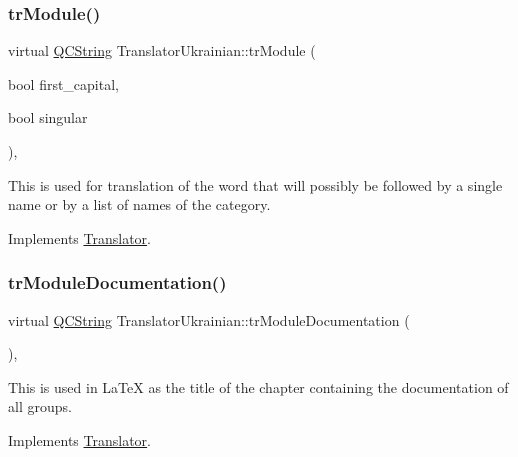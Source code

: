 \mbox{\label{class_translator_ukrainian_a5cc547702356284784fac3be5745b57d}} 
\subsubsection{\texorpdfstring{trModule()}{trModule()}}
{\footnotesize\ttfamily virtual \mbox{\hyperlink{class_q_c_string}{Q\+C\+String}} Translator\+Ukrainian\+::tr\+Module (\begin{DoxyParamCaption}\item[{bool}]{first\+\_\+capital,  }\item[{bool}]{singular }\end{DoxyParamCaption})\hspace{0.3cm}{\ttfamily [inline]}, {\ttfamily [virtual]}}

This is used for translation of the word that will possibly be followed by a single name or by a list of names of the category. 

Implements \mbox{\hyperlink{class_translator}{Translator}}.

\mbox{\label{class_translator_ukrainian_ac277963567d0c0d13d488b24abf76076}} 
\subsubsection{\texorpdfstring{trModuleDocumentation()}{trModuleDocumentation()}}
{\footnotesize\ttfamily virtual \mbox{\hyperlink{class_q_c_string}{Q\+C\+String}} Translator\+Ukrainian\+::tr\+Module\+Documentation (\begin{DoxyParamCaption}{ }\end{DoxyParamCaption})\hspace{0.3cm}{\ttfamily [inline]}, {\ttfamily [virtual]}}

This is used in La\+TeX as the title of the chapter containing the documentation of all groups. 

Implements \mbox{\hyperlink{class_translator}{Translator}}.

\mbox{\label{class_translator_ukrainian_aceb36cbaab014813fe727bb9ca1defe9}} 
